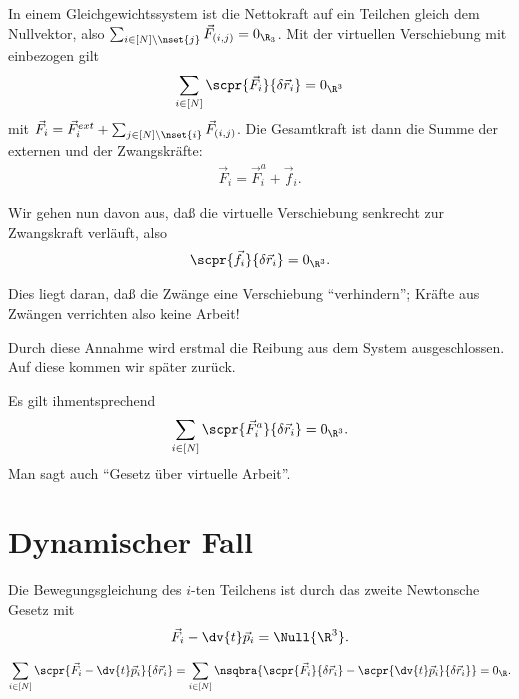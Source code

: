 \documentclass[../main.tex]{subfiles}
\begin{document}
		\begin{bsp}
			In einem Gleichgewichtssystem ist die Nettokraft auf ein Teilchen gleich dem Nullvektor, also $\sum_{i\in[N]\setminus\nset{j}}\vec F_{(i,j)}=0_{\R_3}$. Mit der virtuellen Verschiebung mit einbezogen gilt
			\begin{align*}
				\sum_{i\in[N]}\scpr{\vec{F}_i}{\delta\vec{r}_i}=0_{\R^3}
			\end{align*}
			mit $\vec{F}_i=\vec{F}_i^{ext}+\sum_{j\in[N]\setminus\nset{i}}\vec{F}_{(i,j)}$. Die Gesamtkraft ist dann die Summe der externen und der Zwangskräfte:
			\begin{align*}
				\vec{F}_i=\vec{F}_i^a+\vec f_i. 
			\end{align*}
		\end{bsp}
		\begin{Behauptung}
			Wir gehen nun davon aus, daß die virtuelle Verschiebung senkrecht zur Zwangskraft verläuft, also
			\begin{align*}
				\scpr{\vec{f}_i}{\delta\vec{r}_i}=0_{\R^3}. 
			\end{align*}
		\end{Behauptung}
		\begin{begruendung}
			Dies liegt daran, daß die Zwänge eine Verschiebung \enquote{verhindern}; Kräfte aus Zwängen verrichten also keine Arbeit! 
		\end{begruendung}
		Durch diese Annahme wird erstmal die Reibung aus dem System ausgeschlossen. Auf diese kommen wir später zurück. 
		\begin{info}
			Es gilt ihmentsprechend 
			\begin{align*}
				\sum_{i\in[N]}\scpr{\vec{F}_i^a}{\delta\vec{r}_i}=0_{\R^3}. 
			\end{align*}
			Man sagt auch \enquote{Gesetz über virtuelle Arbeit}.
		\end{info}
		
	\section{Dynamischer Fall}
		Die Bewegungsgleichung des $i$-ten Teilchens ist durch das zweite Newtonsche Gesetz mit 
		\begin{align*}
			\vec{F}_i-\dv{t}\vec{p}_i=\Null{\R^3}.
		\end{align*}
		\begin{info}
			\begin{align*}
				\sum_{i\in[N]}\scpr{\vec{F}_i-\dv{t}\vec{p}_i}{\delta\vec{r}_i}=
				\sum_{i\in[N]}\nsqbra{\scpr{\vec F_i}{\delta\vec{r}_i}-\scpr{\dv{t}\vec p_i}{\delta\vec r_i}}
				=0_{\R}. 
			\end{align*}
		\end{info}
\end{document}

